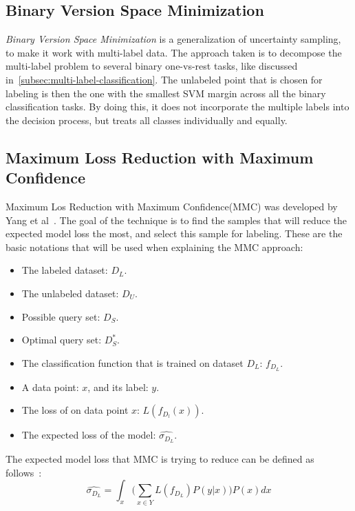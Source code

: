 \subsection{Binary Version Space Minimization}\label{subsec:binmin}

\textit{Binary Version Space Minimization} is a generalization of uncertainty sampling, to make it work with multi-label data.
The approach taken is to decompose the multi-label problem to several binary one-vs-rest tasks, like discussed in~\ref{subsec:multi-label-classification}.
The unlabeled point that is chosen for labeling is then the one with the smallest SVM margin across all the binary classification tasks.
By doing this, it does not incorporate the multiple labels into the decision process, but treats all classes individually and equally. 

\subsection{Maximum Loss Reduction with Maximum Confidence}\label{subsec:mmc}

Maximum Los Reduction with Maximum Confidence(MMC) was developed by Yang et al~\cite{yang2009effective}.
The goal of the technique is to find the samples that will reduce the expected model loss the most, and select this sample for labeling.
These are the basic notations that will be used when explaining the MMC approach:
\begin{itemize}
    \item The labeled dataset: $D_L$.
    \item The unlabeled dataset: $D_U$.
    \item Possible query set: $D_S$.
    \item Optimal query set: $D^*_S$.
    \item The classification function that is trained on dataset $D_L$: $f_{D_L}$.
    \item A data point: $x$, and its label: $y$.
    \item The loss of on data point $x$: $L(f_{D_l}(x))$.
    \item The expected loss of the model: $\widehat{\sigma_{D_L}}$.
\end{itemize}

The expected model loss that MMC is trying to reduce can be defined as follows~\cite{yang2009effective}:
\begin{equation}
    \widehat{\sigma_{D_L}} = \int_x \bigg ( \sum_{x \in Y} L(f_{D_L})P(y|x) \bigg ) P(x)dx
\end{equation}

